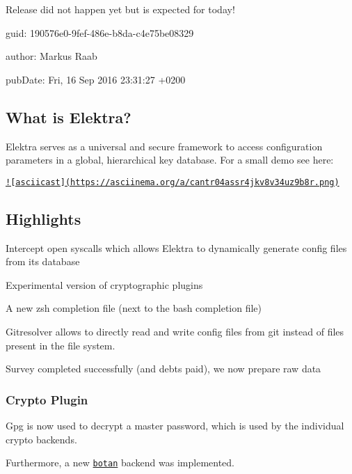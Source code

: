 Release did not happen yet but is expected for today!


\begin{DoxyItemize}
\item guid\+: 190576e0-\/9fef-\/486e-\/b8da-\/c4e75be08329
\item author\+: Markus Raab
\item pub\+Date\+: Fri, 16 Sep 2016 23\+:31\+:27 +0200
\end{DoxyItemize}

\subsection*{What is Elektra?}

Elektra serves as a universal and secure framework to access configuration parameters in a global, hierarchical key database. For a small demo see here\+:

\href{https://asciinema.org/a/cantr04assr4jkv8v34uz9b8r}{\tt !\mbox{[}asciicast\mbox{]}(https\+://asciinema.\+org/a/cantr04assr4jkv8v34uz9b8r.\+png)}

\subsection*{Highlights}


\begin{DoxyItemize}
\item Intercept open syscalls which allows Elektra to dynamically generate config files from its database
\item Experimental version of cryptographic plugins
\item A new zsh completion file (next to the bash completion file)
\item Gitresolver allows to directly read and write config files from git instead of files present in the file system.
\item Survey completed successfully (and debts paid), we now prepare raw data
\end{DoxyItemize}

\subsubsection*{Crypto Plugin}

Gpg is now used to decrypt a master password, which is used by the individual crypto backends.

Furthermore, a new \href{https://botan.randombit.net}{\tt botan} backend was implemented.

